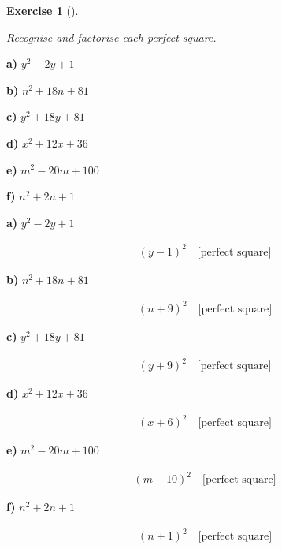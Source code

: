\documentclass[
  letterpaper,
  DIV=11,
  numbers=noendperiod]{scrreprt}
\theoremstyle{definition}
\newtheorem{exercise}{Exercise}[chapter]
\theoremstyle{remark}
\begin{document}
\begin{exercise}[]\protect\hypertarget{exr-u6-7}{}\label{exr-u6-7}

\emph{Recognise and factorise each perfect square.}

\textbf{a)} \(\displaystyle y^2 - 2y + 1\)

\textbf{b)} \(\displaystyle n^2 + 18n + 81\)

\textbf{c)} \(\displaystyle y^2 + 18y + 81\)

\textbf{d)} \(\displaystyle x^2 + 12x + 36\)

\textbf{e)} \(\displaystyle m^2 - 20m + 100\)

\textbf{f)} \(\displaystyle n^2 + 2n + 1\)

\begin{tcolorbox}[enhanced jigsaw, opacitybacktitle=0.6, coltitle=black, arc=.35mm, colframe=quarto-callout-tip-color-frame, colback=white, bottomrule=.15mm, left=2mm, colbacktitle=quarto-callout-tip-color!10!white, titlerule=0mm, opacityback=0, title=\textcolor{quarto-callout-tip-color}{\faLightbulb}\hspace{0.5em}{🔍 View Solutions}, leftrule=.75mm, breakable, rightrule=.15mm, bottomtitle=1mm, toptitle=1mm, toprule=.15mm]

\textbf{a)} \(\displaystyle y^2 - 2y + 1\)

\begin{align*}
(y - 1)^2 \quad \text{[perfect square]}
\end{align*}

\textbf{b)} \(\displaystyle n^2 + 18n + 81\)

\begin{align*}
(n + 9)^2 \quad \text{[perfect square]}
\end{align*}

\textbf{c)} \(\displaystyle y^2 + 18y + 81\)

\begin{align*}
(y + 9)^2 \quad \text{[perfect square]}
\end{align*}

\textbf{d)} \(\displaystyle x^2 + 12x + 36\)

\begin{align*}
(x + 6)^2 \quad \text{[perfect square]}
\end{align*}

\textbf{e)} \(\displaystyle m^2 - 20m + 100\)

\begin{align*}
(m - 10)^2 \quad \text{[perfect square]}
\end{align*}

\textbf{f)} \(\displaystyle n^2 + 2n + 1\)

\begin{align*}
(n + 1)^2 \quad \text{[perfect square]}
\end{align*}

\end{tcolorbox}

\end{exercise}
\end{document}
